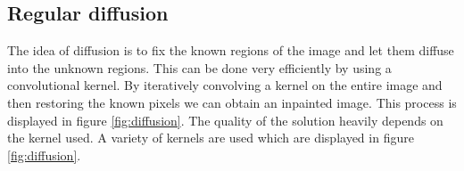\subsection{Regular diffusion}
The idea of diffusion is to fix the known regions of the image and let them diffuse into the unknown regions. This can be done very efficiently by using a convolutional kernel. By iteratively convolving a kernel on the entire image and then restoring the known pixels we can obtain an inpainted image. This process is displayed in figure \ref{fig:diffusion}. The quality of the solution heavily depends on the kernel used. A variety of kernels are used which are displayed in figure \ref{fig:diffusion}.

